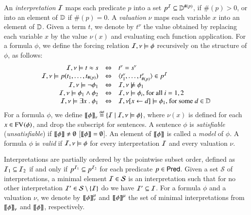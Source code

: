 \documentclass{llncs}
\begin{document}

An \emph{interpretation} $\mathcal{I}$ maps each predicate $p$ into a set $p^{\mathcal{I}}
\subseteq \mathbb{D}^{\#(p)}$, if $\#(p)>0$, or into an element of $\mathbb{D}$
if $\#(p)=0$. A \emph{valuation} $\nu$ maps each variable $x$ into an
element of $\mathbb{D}$. Given a term $t$, we denote by $t^\nu$ the value
obtained by replacing each variable $x$ by the value $\nu(x)$ and
evaluating each function application. For a formula $\phi$, we define
the forcing relation $\mathcal{I},\nu \models \phi$ recursively on the
structure of $\phi$, as follows:
\[
\begin{array}{rcl}
\mathcal{I},\nu \models t \approx s & \Leftrightarrow & t^\nu=s^\nu \\
\mathcal{I},\nu \models p(t_1,\ldots,t_{\#(p)}) & \Leftrightarrow & \langle t_1^\nu,\ldots,t_{\#(p)}^\nu \rangle \in p^{\mathcal{I}} \\
\mathcal{I},\nu \models \neg\phi_1 & \Leftrightarrow & \mathcal{I},\nu \not\models \phi_1 \\
\mathcal{I},\nu \models \phi_1 \wedge \phi_2 & \Leftrightarrow & \mathcal{I},\nu \models \phi_i \text{, for all } i=1,2 \\ 
\mathcal{I},\nu \models \exists x ~.~ \phi_1 & \Leftrightarrow & \mathcal{I},\nu[x\leftarrow d] \models \phi_1 \text{, for some } d \in \mathbb{D} 
\end{array}
\]
For a formula $\phi$, we define ${\bf [\![} \phi {\bf ]\!]}_\nu \stackrel{\scriptscriptstyle{\mathsf{def}}}{=} \{ \mathcal{I} \mid
  \mathcal{I},\nu \models \phi \}$, where $\nu(x)$ is defined for each $x \in
\mathrm{FV}_{}(\phi)$, and drop the subscript for sentences. A sentence $\phi$
is \emph{satisfiable} (\emph{unsatisfiable}) if
${\bf [\![} \phi {\bf ]\!]}\neq\emptyset$ [${\bf [\![} \phi {\bf ]\!]}=\emptyset$]. An element of
${\bf [\![} \phi {\bf ]\!]}$ is called a \emph{model} of $\phi$. A formula $\phi$ is
\emph{valid} if $\mathcal{I},\nu \models \phi$ for every interpretation $\mathcal{I}$
and every valuation $\nu$.

Interpretations are partially ordered by the pointwise subset order,
defined as $\mathcal{I}_1 \subseteq \mathcal{I}_2$ if and only if $p^{\mathcal{I}_1} \subseteq
p^{\mathcal{I}_2}$ for each predicate $p \in \mathsf{Pred}$. Given a set $\mathcal{S}$
of interpretations, a minimal element $\mathcal{I} \in \mathcal{S}$ is an
interpretation such that for no other interpretation $\mathcal{I}' \in
\mathcal{S} \setminus \{ \mathcal{I} \}$ do we have $\mathcal{I}' \subseteq \mathcal{I}$. For a
formula $\phi$ and a valuation $\nu$, we denote by ${\bf [\![} \phi {\bf ]\!]}^\mu_\nu$
and ${\bf [\![} \phi {\bf ]\!]}^\mu$ the set of minimal interpretations from
${\bf [\![} \phi {\bf ]\!]}_\nu$ and ${\bf [\![} \phi {\bf ]\!]}$, respectively.
\end{document}
